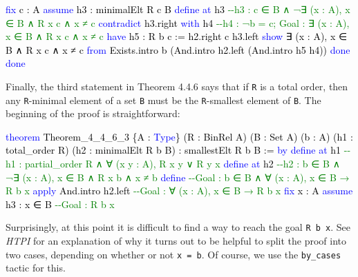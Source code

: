\documentclass[
  letterpaper,
  DIV=11,
  numbers=noendperiod]{scrreprt}
\makeatletter
\newenvironment{Shaded}{\begin{snugshade}}{\end{snugshade}}
\newcommand{\CommentTok}[1]{\textcolor[rgb]{0.37,0.37,0.37}{#1}}
\newcommand{\KeywordTok}[1]{\textcolor[rgb]{0.00,0.23,0.31}{#1}}
\newcommand{\NormalTok}[1]{\textcolor[rgb]{0.00,0.23,0.31}{#1}}
\newcommand{\SpecialCharTok}[1]{\textcolor[rgb]{0.37,0.37,0.37}{#1}}
\newcommand{\WarningTok}[1]{\textcolor[rgb]{0.37,0.37,0.37}{\textit{#1}}}
\def\redsquiggly{\bgroup \markoverwith{\textcolor{red}{\lower3.5\p@\hbox{\sixly \char58}}}\ULon}
\renewcommand{\NormalTok}[1]{\textcolor[HTML]{000000}{#1}}
\renewcommand{\KeywordTok}[1]{\textcolor[HTML]{0000FF}{#1}}
\renewcommand{\SpecialCharTok}[1]{}
\renewcommand{\WarningTok}[1]{\redsquiggly{\textcolor[HTML]{0000FF}{#1}}}
\renewcommand{\CommentTok}[1]{\textcolor[HTML]{008000}{#1}}
\theoremstyle{remark}
\makeatother
\begin{document}
\begin{Shaded}
\begin{Highlighting}[]
    \KeywordTok{fix}\NormalTok{ c : A}
    \KeywordTok{assume}\NormalTok{ h3 : minimalElt R c B}
    \KeywordTok{define} \KeywordTok{at}\NormalTok{ h3    }\CommentTok{{-}{-}h3 : c ∈ B ∧ ¬∃ (x : A), x ∈ B ∧ R x c ∧ x ≠ c}
    \KeywordTok{contradict}\NormalTok{ h3.right }\KeywordTok{with}\NormalTok{ h4}
                  \CommentTok{{-}{-}h4 : ¬b = c; Goal : ∃ (x : A), x ∈ B ∧ R x c ∧ x ≠ c}
    \KeywordTok{have}\NormalTok{ h5 : R b c := h2.right c h3.left}
    \KeywordTok{show}\NormalTok{ ∃ (x : A), x ∈ B ∧ R x c ∧ x ≠ c }\KeywordTok{from}
\NormalTok{      Exists.intro b (And.intro h2.left (And.intro h5 h4))}
    \KeywordTok{done}
  \KeywordTok{done}
\end{Highlighting}
\end{Shaded}

Finally, the third statement in Theorem 4.4.6 says that if \texttt{R} is
a total order, then any \texttt{R}-minimal element of a set \texttt{B}
must be the \texttt{R}-smallest element of \texttt{B}. The beginning of
the proof is straightforward:

\begin{Shaded}
\begin{Highlighting}[]
\KeywordTok{theorem}\NormalTok{ Theorem\_4\_4\_6\_3 \{A : }\KeywordTok{Type}\NormalTok{\} (R : BinRel A) (B : Set A) (b : A)}
\NormalTok{    (h1 : total\_order R) (h2 : minimalElt R b B) : smallestElt R b B := }\KeywordTok{by}
  \KeywordTok{define} \KeywordTok{at}\NormalTok{ h1         }\CommentTok{{-}{-}h1 : partial\_order R ∧ ∀ (x y : A), R x y ∨ R y x}
  \KeywordTok{define} \KeywordTok{at}\NormalTok{ h2         }\CommentTok{{-}{-}h2 : b ∈ B ∧ ¬∃ (x : A), x ∈ B ∧ R x b ∧ x ≠ b}
  \KeywordTok{define}               \CommentTok{{-}{-}Goal : b ∈ B ∧ ∀ (x : A), x ∈ B → R b x}
  \KeywordTok{apply}\NormalTok{ And.intro h2.left  }\CommentTok{{-}{-}Goal : ∀ (x : A), x ∈ B → R b x}
  \KeywordTok{fix}\NormalTok{ x : A}
  \KeywordTok{assume}\NormalTok{ h3 : x ∈ B        }\CommentTok{{-}{-}Goal : R b x}
  \SpecialCharTok{**}\WarningTok{done}\SpecialCharTok{::}
\end{Highlighting}
\end{Shaded}

Surprisingly, at this point it is difficult to find a way to reach the
goal \texttt{R\ b\ x}. See \emph{HTPI} for an explanation of why it
turns out to be helpful to split the proof into two cases, depending on
whether or not \texttt{x\ =\ b}. Of course, we use the
\texttt{by\_cases} tactic for this.
\end{document}
